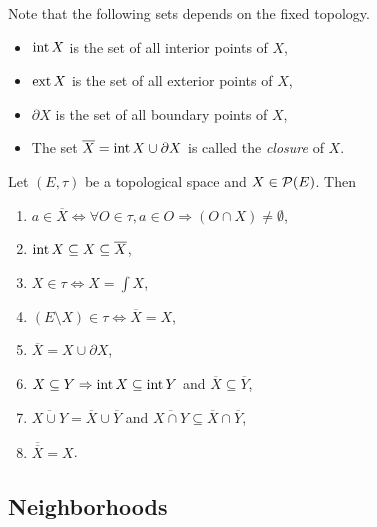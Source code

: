 \begin{notation}
Note that the following sets depends on the fixed topology.
    \begin{itemize}
        \item $\operatorname{int} X$ is the set of all interior points of $X$,
        \item $\operatorname{ext} X$ is the set of all exterior points of $X$,
        \item $\partial X$ is the set of all boundary points of $X$,
        \item The set $\overline X = \operatorname{int} X \cup \partial X$ is called the \emph{closure} of $X$.
    \end{itemize}
\end{notation}

\begin{proposition}
    Let $(E, \tau)$ be a topological space and $X \in \mathcal{P}(E)$. Then
    \begin{enumerate}
        \item $a \in \overline{X} \Leftrightarrow \forall O \in \tau , a \in O \Rightarrow (O \cap X) \neq \emptyset$,
        \item $\operatorname{int} X \subseteq X \subseteq \overline{X}$,
        \item $X \in \tau \Leftrightarrow X = \int X$,
        \item $(E \setminus X) \in \tau \Leftrightarrow \overline{X} = X$,
        \item $\overline{X} = X \cup \partial X$,
        \item $X \subseteq Y \Rightarrow \operatorname{int} X \subseteq \operatorname{int} Y$ and $\overline{X} \subseteq \overline{Y}$,
        \item $\overline{X \cup Y} = \overline{X} \cup \overline{Y}$ and $\overline{X \cap Y} \subseteq \overline{X} \cap \overline{Y}$,
        \item $\overline{\overline{X}} = X$.
    \end{enumerate}
\end{proposition}
\subsection{Neighborhoods}
